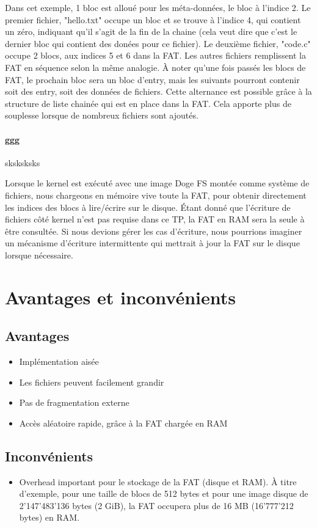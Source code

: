 \documentclass[a4paper, 12pt]{article}
\begin{document}
Dans cet exemple, 1 bloc est alloué pour les méta-données, le bloc à l'indice 2. 
Le premier fichier, "hello.txt" occupe un bloc et se trouve à l'indice 4, qui contient un zéro, indiquant 
qu'il s'agit de la fin de la chaine (cela veut dire que c'est le dernier bloc qui contient des donées pour
ce fichier). Le deuxième fichier, "code.c" occupe 2 blocs, aux indices 5 et 6 dans la FAT.
Les autres fichiers remplissent la FAT en séquence selon la même analogie.
À noter qu'une fois passés les blocs de FAT, le prochain bloc sera un bloc d'entry, mais les suivants pourront
contenir soit des entry, soit des données de fichiers. Cette alternance est possible grâce à la structure 
de liste chainée qui est en place dans la FAT. Cela apporte plus de souplesse lorsque de nombreux fichiers 
sont ajoutés.
\bigbreak

\paragraph{ggg} sksksksks

Lorsque le kernel est exécuté avec une image Doge FS montée comme système de fichiers, nous chargeons en 
mémoire vive toute la FAT, pour obtenir directement les indices des blocs à lire/écrire sur le disque. Étant 
donné que l'écriture de fichiers côté kernel n'est pas requise dans ce TP, la FAT en RAM sera la seule à être 
consultée. Si nous devions gérer les cas d'écriture, nous pourrions imaginer un mécanisme d'écriture intermittente
qui mettrait à jour la FAT sur le disque lorsque nécessaire.

\section{Avantages et inconvénients}
\subsection{Avantages}
\begin{itemize}
	\item Implémentation aisée
	\item Les fichiers peuvent facilement grandir
	\item Pas de fragmentation externe
	\item Accès aléatoire rapide, grâce à la FAT chargée en RAM
\end{itemize}
\subsection{Inconvénients}
\begin{itemize}
	\item Overhead important pour le stockage de la FAT (disque et RAM). À titre d'exemple, pour une taille de 
	blocs de 512 bytes et pour une image disque de 2'147'483'136 bytes (2 GiB), la FAT occupera plus de 16 MB 
	(16'777'212 bytes) en RAM.
\end{itemize}
\end{document}
